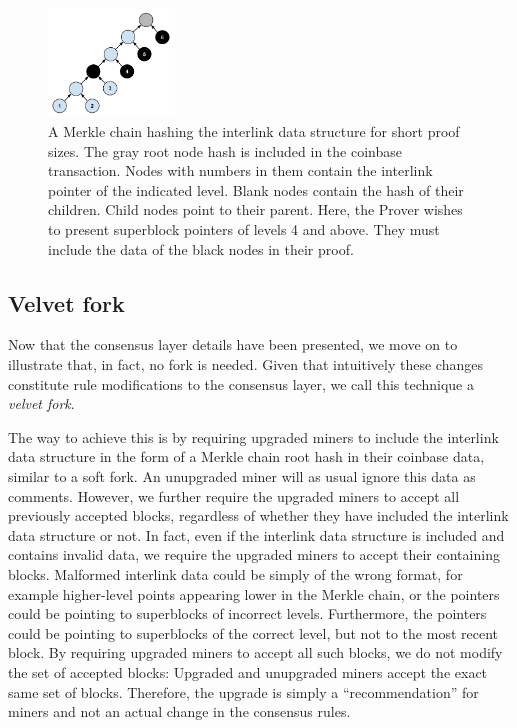 \begin{figure}[h]
    \caption{\label{fig.merkle_chain}
    A Merkle chain hashing the interlink data structure for short
    proof sizes. The gray root node hash is included in the coinbase
    transaction. Nodes with numbers in them contain the interlink pointer of
    the indicated level. Blank nodes contain the hash of their children. Child
    nodes point to their parent. Here, the Prover wishes to present superblock
    pointers of levels 4 and above. They must include the data of the black
    nodes in their proof.}
    \centering
    \includegraphics[width=0.3\textwidth,keepaspectratio]{figures/merkle-chain.png}
\end{figure}

\subsection{Velvet fork}

Now that the consensus layer details have been presented, we move on to
illustrate that, in fact, no fork is needed. Given that intuitively these
changes constitute rule modifications to the consensus layer, we call this
technique a \textit{velvet fork}.

The way to achieve this is by requiring upgraded miners to include the
interlink data structure in the form of a Merkle chain root hash in their
coinbase data, similar to a soft fork. An unupgraded miner will as usual ignore
this data as comments. However, we further require the upgraded miners to
accept all previously accepted blocks, regardless of whether they have included
the interlink data structure or not. In fact, even if the interlink data
structure is included and contains invalid data, we require the upgraded miners
to accept their containing blocks. Malformed interlink data could be simply of
the wrong format, for example higher-level points appearing lower in the Merkle
chain, or the pointers could be pointing to superblocks of incorrect
levels. Furthermore, the pointers could be pointing to superblocks of the
correct level, but not to the most recent block. By requiring upgraded miners
to accept all such blocks, we do not modify the set of accepted blocks:
Upgraded and unupgraded miners accept the exact same set of blocks. Therefore,
the upgrade is simply a ``recommendation'' for miners and not an actual change in
the consensus rules.

